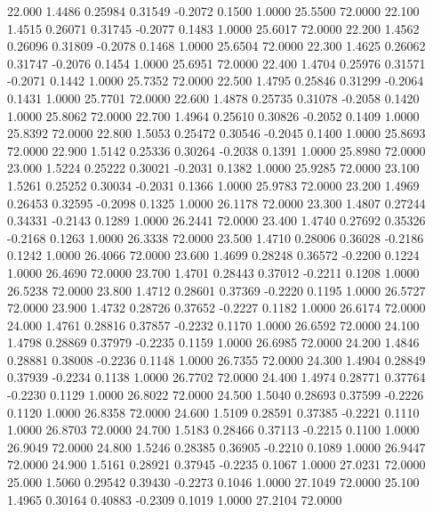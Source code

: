   22.000   1.4486   0.25984   0.31549  -0.2072   0.1500   1.0000  25.5500  72.0000
  22.100   1.4515   0.26071   0.31745  -0.2077   0.1483   1.0000  25.6017  72.0000
  22.200   1.4562   0.26096   0.31809  -0.2078   0.1468   1.0000  25.6504  72.0000
  22.300   1.4625   0.26062   0.31747  -0.2076   0.1454   1.0000  25.6951  72.0000
  22.400   1.4704   0.25976   0.31571  -0.2071   0.1442   1.0000  25.7352  72.0000
  22.500   1.4795   0.25846   0.31299  -0.2064   0.1431   1.0000  25.7701  72.0000
  22.600   1.4878   0.25735   0.31078  -0.2058   0.1420   1.0000  25.8062  72.0000
  22.700   1.4964   0.25610   0.30826  -0.2052   0.1409   1.0000  25.8392  72.0000
  22.800   1.5053   0.25472   0.30546  -0.2045   0.1400   1.0000  25.8693  72.0000
  22.900   1.5142   0.25336   0.30264  -0.2038   0.1391   1.0000  25.8980  72.0000
  23.000   1.5224   0.25222   0.30021  -0.2031   0.1382   1.0000  25.9285  72.0000
  23.100   1.5261   0.25252   0.30034  -0.2031   0.1366   1.0000  25.9783  72.0000
  23.200   1.4969   0.26453   0.32595  -0.2098   0.1325   1.0000  26.1178  72.0000
  23.300   1.4807   0.27244   0.34331  -0.2143   0.1289   1.0000  26.2441  72.0000
  23.400   1.4740   0.27692   0.35326  -0.2168   0.1263   1.0000  26.3338  72.0000
  23.500   1.4710   0.28006   0.36028  -0.2186   0.1242   1.0000  26.4066  72.0000
  23.600   1.4699   0.28248   0.36572  -0.2200   0.1224   1.0000  26.4690  72.0000
  23.700   1.4701   0.28443   0.37012  -0.2211   0.1208   1.0000  26.5238  72.0000
  23.800   1.4712   0.28601   0.37369  -0.2220   0.1195   1.0000  26.5727  72.0000
  23.900   1.4732   0.28726   0.37652  -0.2227   0.1182   1.0000  26.6174  72.0000
  24.000   1.4761   0.28816   0.37857  -0.2232   0.1170   1.0000  26.6592  72.0000
  24.100   1.4798   0.28869   0.37979  -0.2235   0.1159   1.0000  26.6985  72.0000
  24.200   1.4846   0.28881   0.38008  -0.2236   0.1148   1.0000  26.7355  72.0000
  24.300   1.4904   0.28849   0.37939  -0.2234   0.1138   1.0000  26.7702  72.0000
  24.400   1.4974   0.28771   0.37764  -0.2230   0.1129   1.0000  26.8022  72.0000
  24.500   1.5040   0.28693   0.37599  -0.2226   0.1120   1.0000  26.8358  72.0000
  24.600   1.5109   0.28591   0.37385  -0.2221   0.1110   1.0000  26.8703  72.0000
  24.700   1.5183   0.28466   0.37113  -0.2215   0.1100   1.0000  26.9049  72.0000
  24.800   1.5246   0.28385   0.36905  -0.2210   0.1089   1.0000  26.9447  72.0000
  24.900   1.5161   0.28921   0.37945  -0.2235   0.1067   1.0000  27.0231  72.0000
  25.000   1.5060   0.29542   0.39430  -0.2273   0.1046   1.0000  27.1049  72.0000
  25.100   1.4965   0.30164   0.40883  -0.2309   0.1019   1.0000  27.2104  72.0000

